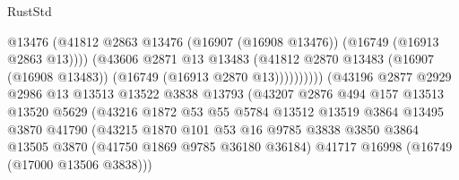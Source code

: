 \begin{lexlean}{RustStd}
\begin{coremodule}
                                            @13476
                                            (@41812
                                              @2863
                                              @13476
                                              (@16907 (@16908 @13476))
                                              (@16749 (@16913 @2863 @13))))
                                          (@43606
                                            @2871
                                            @13
                                            @13483
                                            (@41812
                                              @2870
                                              @13483
                                              (@16907 (@16908 @13483))
                                              (@16749 (@16913 @2870 @13))))))))))
                              (@43196
                                @2877
                                @2929
                                @2986
                                @13
                                @13513
                                @13522
                                @3838
                                @13793
                                (@43207
                                  @2876
                                  @494
                                  @157
                                  @13513
                                  @13520
                                  @5629
                                  (@43216
                                    @1872
                                    @53
                                    @55
                                    @5784
                                    @13512
                                    @13519
                                    @3864
                                    @13495
                                    @3870
                                    @41790
                                    (@43215
                                      @1870
                                      @101
                                      @53
                                      @16
                                      @9785
                                      @3838
                                      @3850
                                      @3864
                                      @13505
                                      @3870
                                      (@41750 @1869 @9785 @36180 @36184)
                                      @41717
                                      @16998
                                      (@16749 (@17000 @13506 @3838)))

\end{coremodule}
\end{lexlean}
